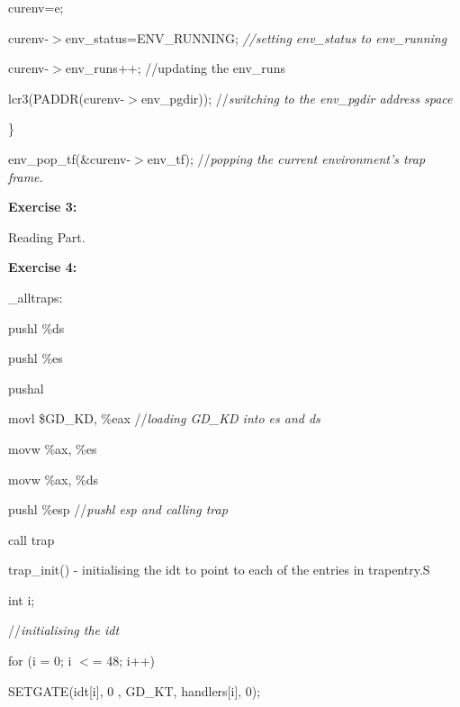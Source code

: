 \documentclass[a4paper,portrait,12pt]{article}
\begin{document}
\textcolor[rgb]{0.000,0.000,0.000}{		curenv=e;}


\textcolor[rgb]{0.000,0.000,0.000}{		curenv-$>$env\_status=ENV\_RUNNING; }\emph{\textcolor[rgb]{0.000,0.000,0.000}{//setting env\_status to env\_running}}


\textcolor[rgb]{0.000,0.000,0.000}{		curenv-$>$env\_runs++; //updating the env\_runs}


\textcolor[rgb]{0.000,0.000,0.000}{	           lcr3(PADDR(curenv-$>$env\_pgdir)); //}\emph{\textcolor[rgb]{0.000,0.000,0.000}{switching to the env\_pgdir address space}}


\textcolor[rgb]{0.000,0.000,0.000}{	\}}


\textcolor[rgb]{0.000,0.000,0.000}{	env\_pop\_tf(\&curenv-$>$env\_tf); //}\emph{\textcolor[rgb]{0.000,0.000,0.000}{popping the current environment's trap frame.}}








\textbf{\textcolor[rgb]{0.000,0.000,0.000}{Exercise 3:}}


\textcolor[rgb]{0.000,0.000,0.000}{		Reading Part.}





\textbf{\textcolor[rgb]{0.000,0.000,0.000}{Exercise 4:}}





\textcolor[rgb]{0.000,0.000,0.000}{\_alltraps:}


pushl \%ds


pushl \%es


pushal


movl \$GD\_KD, \%eax  //\emph{loading GD\_KD into es and ds}


movw \%ax, \%es


movw \%ax, \%ds


pushl \%esp    //\emph{pushl esp and calling trap}


call trap





trap\_init() - initialising the idt to point to each of the entries in trapentry.S





	int i;


	//\emph{initialising the idt}


	for (i = 0; i $<$= 48; i++)


		SETGATE(idt[i], 0 , GD\_KT, handlers[i], 0);
\end{document}
